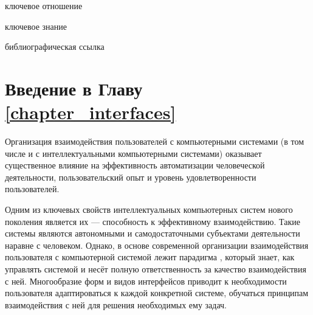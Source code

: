 \begin{SCn}
\bigskip

\begin{scnrelfromlist}{ключевое отношение}
\end{scnrelfromlist}

\bigskip

\begin{scnrelfromlist}{ключевое знание}
\end{scnrelfromlist}

\bigskip

\begin{scnrelfromlist}{библиографическая ссылка}
\end{scnrelfromlist}
\end{SCn}

\section*{Введение в Главу \ref{chapter_interfaces}}

Организация взаимодействия пользователей с компьютерными системами (в том числе и с интеллектуальными компьютерными системами) оказывает существенное влияние на эффективность автоматизации человеческой деятельности, пользовательский опыт и уровень удовлетворенности пользователей. 

Одним из ключевых свойств интеллектуальных компьютерных систем нового поколения является их  --- способность к эффективному взаимодействию. Такие системы являются автономными и самодостаточными субъектами деятельности наравне с человеком. Однако, в основе современной организации взаимодействия пользователя с компьютерной системой лежит парадигма , который знает, как управлять системой и несёт полную ответственность за качество взаимодействия с ней. Многообразие форм и видов интерфейсов приводит к необходимости пользователя адаптироваться к каждой конкретной системе, обучаться принципам взаимодействия с ней для решения необходимых ему задач.

